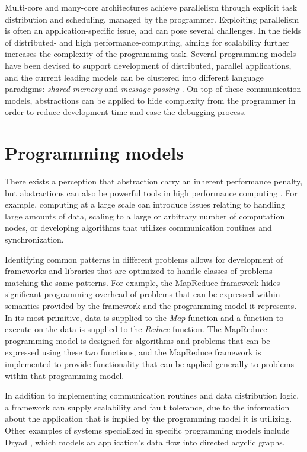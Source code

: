 \documentclass{uit-report}
\begin{document}
Multi-core and many-core architectures achieve parallelism through explicit task distribution and scheduling, managed by the programmer. Exploiting parallelism is often an application-specific issue, and can pose several challenges. In the fields of distributed- and high performance-computing, aiming for scalability further increases the complexity of the programming task. Several programming models have been devised to support development of distributed, parallel applications, and the current leading models can be clustered into different language paradigms: \emph{shared memory }and \emph{message passing} \cite{pgas_languages}. On top of these communication models, abstractions can be applied to hide complexity from the programmer in order to reduce development time and ease the debugging process. 

\section{Programming models}

There exists a perception that abstraction carry an inherent performance penalty, but abstractions can also be powerful tools in high performance computing \cite{mccandless_lumsdaine_1997}. For example, computing at a large scale can introduce issues relating to handling large amounts of data, scaling to a large or arbitrary number of computation nodes, or developing algorithms that utilizes communication routines and synchronization.

Identifying common patterns in different problems allows for development of frameworks and libraries that are optimized to handle classes of problems matching the same patterns. For example, the MapReduce framework hides significant programming overhead of problems that can be expressed within semantics provided by the framework and the programming model it represents. In its most primitive, data is supplied to the \emph{Map} function and a function to execute on the data is supplied to the \emph{Reduce} function. The MapReduce programming model is designed for algorithms and problems that can be expressed using these two functions, and the MapReduce framework is implemented to provide functionality that can be applied generally to problems within that programming model.

In addition to implementing communication routines and data distribution logic, a framework can supply scalability and fault tolerance, due to the information about the application that is implied by the programming model it is utilizing. Other examples of systems specialized in specific programming models include Dryad \cite{dryad}, which models an application's data flow into directed acyclic graphs.
\end{document}
